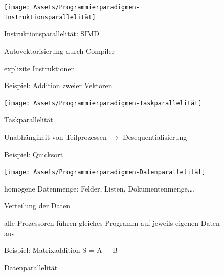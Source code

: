\documentclass[10pt]{article}
\begin{document}
  \begin{figure}[!tbp]
    \centering
    \begin{minipage}[b]{0.45\textwidth}
      \texttt{[image: Assets/Programmierparadigmen-Instruktionsparallelität]}
      \caption{Instruktionsparallelität: SIMD}
      \begin{itemize*}
        \item Autovektorisierung durch Compiler
        \item explizite Instruktionen
        \item Beispiel: Addition zweier Vektoren
      \end{itemize*}
    \end{minipage}
    \hfill
    \begin{minipage}[b]{0.45\textwidth}
      \texttt{[image: Assets/Programmierparadigmen-Taskparallelität]}
      \caption{Taskparallelität}
      \begin{itemize*}
        \item Unabhängikeit von Teilprozessen $\rightarrow$ Desequentialisierung
        \item Beispiel: Quicksort
      \end{itemize*}
    \end{minipage}
    \vfill
    \begin{minipage}[b]{0.45\textwidth}
      \texttt{[image: Assets/Programmierparadigmen-Datenparallelität]}
      \caption{Datenparallelität}
      \begin{itemize*}
        \item homogene Datenmenge: Felder, Listen, Dokumentenmenge,…
        \item Verteilung der Daten
        \item alle Prozessoren führen gleiches Programm auf jeweils eigenen Daten aus
        \item Beispiel: Matrixaddition S = A + B
      \end{itemize*}
    \end{minipage}
  \end{figure}
  
\end{document}
